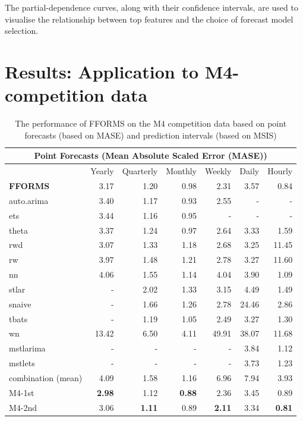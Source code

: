 \documentclass[11pt,a4paper,]{article}
\begin{document}
The partial-dependence curves, along with their confidence intervals, are used to visualise the relationship between top features and the choice of forecast model selection.

\hypertarget{results-application-to-m4-competition-data}{%
\section{Results: Application to M4-competition data}\label{results-application-to-m4-competition-data}}

\begin{table}[!h]
\centering\scriptsize\tabcolsep=0.12cm
\begin{threeparttable}
\caption{The performance of FFORMS on the M4 competition data based on point forecasts (based on MASE) and prediction intervals (based on MSIS)}
\label{forecasts}
\begin{tabular}{l|rrrrrr}
\hline
\multicolumn{7}{c}{Point Forecasts (Mean Absolute Scaled Error (MASE))} \\\hline
 & Yearly & Quarterly & Monthly & Weekly & Daily & Hourly \\\hline
\bf{FFORMS} & 3.17 &  1.20 &  0.98&  2.31& 3.57 &  0.84\\
auto.arima & 3.40 &1.17  &0.93  & 2.55 &  -& - \\
ets & 3.44 &  1.16& 0.95 &  -&-  &  -\\
theta & 3.37 &1.24  & 0.97 &2.64  & 3.33 & 1.59 \\
rwd & 3.07 & 1.33 & 1.18  & 2.68  & 3.25 & 11.45 \\
rw & 3.97 & 1.48 & 1.21  &2.78  & 3.27 & 11.60 \\
nn & 4.06 & 1.55 &  1.14 &4.04 & 3.90 & 1.09 \\
stlar & - & 2.02 &  1.33& 3.15 & 4.49 & 1.49 \\
snaive & - &  1.66& 1.26 &  2.78& 24.46 & 2.86 \\
tbats & - & 1.19 &  1.05& 2.49 & 3.27 &  1.30\\
wn & 13.42 &  6.50&  4.11&  49.91& 38.07 & 11.68 \\
mstlarima & - & - &  - & - & 3.84 &  1.12\\
mstlets & - &  - &  - &  - & 3.73 &  1.23\\
combination (mean) & 4.09 & 1.58 &  1.16&6.96  & 7.94 & 3.93 \\\hline
M4-1st & \bf{2.98} & 1.12 &  \bf{0.88}& 2.36 & 3.45 & 0.89\\
M4-2nd & 3.06 & \bf{1.11} &  0.89& \bf{2.11} & 3.34 & \bf{0.81}\\

\end{tabular}
\end{threeparttable}
\end{table}
\end{document}
